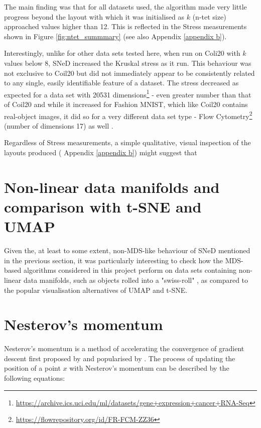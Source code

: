 \documentclass{l4proj}
\begin{document}
The main finding was that for all datasets used, the algorithm made very little progress beyond the layout with which it was initialised as $k$ (n-tet size) approached values higher than 12. This is reflected in the Stress measurements shown in Figure \ref{fig:ntet_summmary} (see also Appendix \ref{appendix b}).

Interestingly, unlike for other data sets tested here, when run on Coli20 with $k$ values below 8, SNeD increased the Kruskal stress as it run. This behaviour was not exclusive to Coil20 but did not immediately appear to be consistently related to any single, easily identifiable feature of a dataset. The stress decreased as expected for a data set with 20531 dimensions\footnote{\url{https://archive.ics.uci.edu/ml/datasets/gene+expression+cancer+RNA-Seq}} - even greater number than that of Coil20 and while it increased for Fashion MNIST, which like Coil20 contains real-object images, it did so for a very different data set type - Flow Cytometry\footnote{\url{https://flowrepository.org/id/FR-FCM-ZZ36}} (number of dimensions 17) as well .

Regardless of Stress measurements, a simple qualitative, visual inspection of the layouts produced ( Appendix \ref{appendix b}) might suggest that 

\section{Non-linear data manifolds and comparison with t-SNE and UMAP}
\label{sec:non-linear}

Given the, at least to some extent, non-MDS-like behaviour of SNeD mentioned in the previous section, it was particularly interesting to check how the MDS-based algorithms considered in this project perform on data sets containing non-linear data manifolds, such as objects rolled into a "swiss-roll" \citep{swissroll}, as compared to the popular visualisation alternatives of UMAP and t-SNE. 



\section{Nesterov's momentum}

Nesterov's momentum is a method of accelerating the convergence of gradient descent first proposed by \citet{og_nesterov} and popularised by \cite{nesterov_hinton}. The process of updating the position of a point $x$ with Nesterov's momentum can be described by the following equations:
\end{document}
